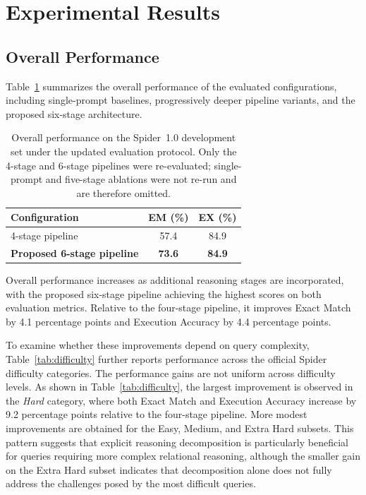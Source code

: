 \documentclass{svproc}
\begin{document}
\section{Experimental Results}
\label{sec:results}

\subsection{Overall Performance}
\label{subsec:overall}

Table~\ref{tab:main} summarizes the overall performance of the evaluated configurations, including single-prompt baselines, progressively deeper pipeline variants, and the proposed six-stage architecture.

\begin{table}[t]
\caption{Overall performance on the Spider~1.0 development set under the updated evaluation protocol. Only the 4-stage and 6-stage pipelines were re-evaluated; single-prompt and five-stage ablations were not re-run and are therefore omitted.}
\scriptsize
\label{tab:main}
\centering
\begin{tabular}{@{}lcc@{}}
\toprule
\textbf{Configuration} & \textbf{EM (\%)} & \textbf{EX (\%)} \\
\midrule
4-stage pipeline & 57.4 & 84.9 \\
\textbf{Proposed 6-stage pipeline} & \textbf{73.6} & \textbf{84.9} \\
\bottomrule
\end{tabular}
\end{table}

Overall performance increases as additional reasoning stages are incorporated, with the proposed six-stage pipeline achieving the highest scores on both evaluation metrics. Relative to the four-stage pipeline, it improves Exact Match by 4.1 percentage points and Execution Accuracy by 4.4 percentage points.

To examine whether these improvements depend on query complexity, Table~\ref{tab:difficulty} further reports performance across the official Spider difficulty categories. The performance gains are not uniform across difficulty levels. As shown in Table~\ref{tab:difficulty}, the largest improvement is observed in the \textit{Hard} category, where both Exact Match and Execution Accuracy increase by 9.2 percentage points relative to the four-stage pipeline. More modest improvements are obtained for the Easy, Medium, and Extra Hard subsets. This pattern suggests that explicit reasoning decomposition is particularly beneficial for queries requiring more complex relational reasoning, although the smaller gain on the Extra Hard subset indicates that decomposition alone does not fully address the challenges posed by the most difficult queries.
\end{document}
